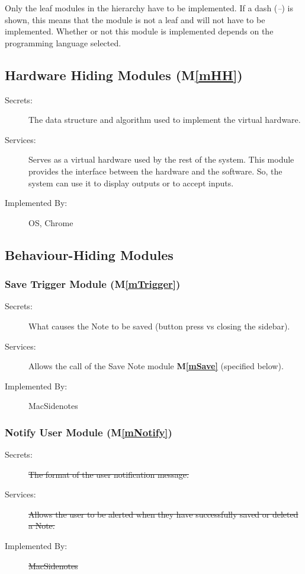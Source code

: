 \documentclass[12pt, titlepage]{article}
\newcommand{\mref}[1]{M\ref{#1}}
\begin{document}
Only the leaf modules in the
hierarchy have to be implemented. If a dash (\emph{--}) is shown, this means
that the module is not a leaf and will not have to be implemented. Whether or
not this module is implemented depends on the programming language
selected.

\subsection{Hardware Hiding Modules (\mref{mHH})}

\begin{description}
\item[Secrets:]The data structure and algorithm used to implement the virtual
  hardware.
\item[Services:]Serves as a virtual hardware used by the rest of the
  system. This module provides the interface between the hardware and the
  software. So, the system can use it to display outputs or to accept inputs.
\item[Implemented By:] OS, Chrome
\end{description}

\subsection{Behaviour-Hiding Modules}

\subsubsection{Save Trigger Module (\mref{mTrigger})}

\begin{description}
\item[Secrets:]What causes the Note to be saved (button press vs closing the 
	sidebar).
\item[Services:]Allows the call of the Save Note module \textbf{\mref{mSave}} 
(specified below).
\item[Implemented By:] MacSidenotes
\end{description}


\subsubsection{Notify User Module (\mref{mNotify})}

\begin{description}
\item[Secrets:]\sout{The format of the user notification message.}
\item[Services:]\sout{Allows the user to be alerted when they have successfully saved 
or deleted a Note.}
\item[Implemented By:] \sout{MacSidenotes}
\end{description}
\end{document}
